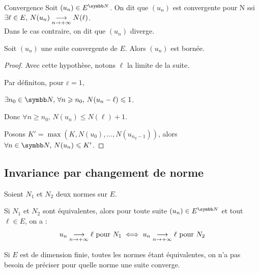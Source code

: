 \begin{definition}{Convergence}{}
    Soit $(u_n) \in E^{\N}$. On dit que $(u_n)$ est convergente pour N ssi 
    $\exists \ell \in E, \, N(u_n) \underset{n \to +\infty}{\longrightarrow} N(\ell)$. \\

    Dans le cas contraire, on dit que $(u_n)$ diverge.
\end{definition}

\begin{definition}{}{}
    Soit $(u_n)$ une suite convergente de $E$. Alors $(u_n)$ est bornée.
\end{definition}


\begin{proof}
    Avec cette hypothèse, notons $\ell$ la limite de la suite. 

    Par définiton, pour $\varepsilon = 1$,
    
    $\exists n_0 \in \N, \, \forall n \geqslant n_0, \, N(u_n - \ell) \leqslant 1$.

    Donc $\forall n \geqslant n_0, \, N(u_n) \leqslant N(\ell) + 1$.

    Posons $K' = \max(K, N(u_0), \ldots, N(u_{n_0 - 1}))$, alors $\forall n \in \N, \, N(u_n) \leqslant K'$.
\end{proof}

\subsection{Invariance par changement de norme}
\begin{theoreme}{}{}
    Soient $N_1$ et $N_2$ deux normes sur $E$. 

    Si $N_1$ et $N_2$ sont équivalentes, alors pour toute suite $(u_n) \in E^{\N}$ 
    et tout $\ell \in E$, on a :
    \[u_n \underset{n \to +\infty}{\longrightarrow} \ell \text{ pour } N_1 \iff u_n \underset{n \to +\infty}{\longrightarrow} \ell \text{ pour } N_2\]
\end{theoreme}

\begin{remarque}
    Si $E$ est de dimension finie, toutes les normes étant équivalentes, on n'a pas besoin de préciser pour quelle norme une suite converge.
\end{remarque}


